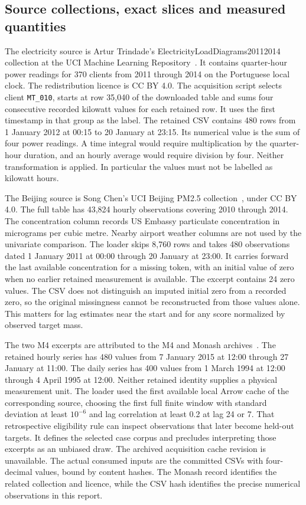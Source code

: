 \subsection{Source collections, exact slices and measured quantities}
\label{sec:source-slices}
The electricity source is Artur Trindade's ElectricityLoadDiagrams20112014 collection at the UCI Machine Learning Repository~\cite{electricity}. It contains quarter-hour power readings for 370 clients from 2011 through 2014 on the Portuguese local clock. The redistribution licence is CC BY 4.0. The acquisition script selects client \texttt{MT\_010}, starts at row 35,040 of the downloaded table and sums four consecutive recorded kilowatt values for each retained row. It uses the first timestamp in that group as the label. The retained CSV contains 480 rows from 1 January 2012 at 00:15 to 20 January at 23:15. Its numerical value is the sum of four power readings. A time integral would require multiplication by the quarter-hour duration, and an hourly average would require division by four. Neither transformation is applied. In particular the values must not be labelled as kilowatt hours.

The Beijing source is Song Chen's UCI Beijing PM2.5 collection~\cite{beijing}, under CC BY 4.0. The full table has 43,824 hourly observations covering 2010 through 2014. The concentration column records US Embassy particulate concentration in micrograms per cubic metre. Nearby airport weather columns are not used by the univariate comparison. The loader skips 8,760 rows and takes 480 observations dated 1 January 2011 at 00:00 through 20 January at 23:00. It carries forward the last available concentration for a missing token, with an initial value of zero when no earlier retained measurement is available. The excerpt contains 24 zero values. The CSV does not distinguish an imputed initial zero from a recorded zero, so the original missingness cannot be reconstructed from those values alone. This matters for lag estimates near the start and for any score normalized by observed target mass.

The two M4 excerpts are attributed to the M4 and Monash archives~\cite{m4daily,m4hourly}. The retained hourly series has 480 values from 7 January 2015 at 12:00 through 27 January at 11:00. The daily series has 400 values from 1 March 1994 at 12:00 through 4 April 1995 at 12:00. Neither retained identity supplies a physical measurement unit. The loader used the first available local Arrow cache of the corresponding source, choosing the first full finite window with standard deviation at least $10^{-6}$ and lag correlation at least 0.2 at lag 24 or 7. That retrospective eligibility rule can inspect observations that later become held-out targets. It defines the selected case corpus and precludes interpreting those excerpts as an unbiased draw. The archived acquisition cache revision is unavailable. The actual consumed inputs are the committed CSVs with four-decimal values, bound by content hashes. The Monash record identifies the related collection and licence, while the CSV hash identifies the precise numerical observations in this report.
